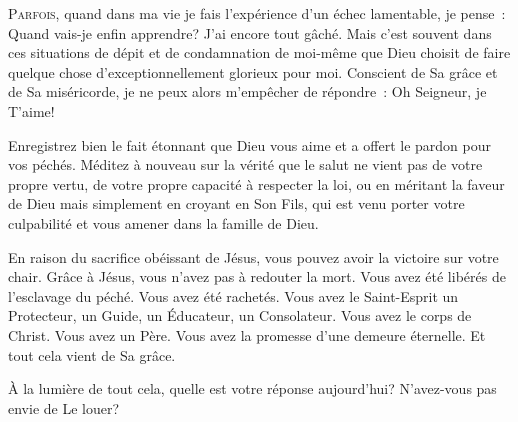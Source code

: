 \dvrule






\lettrine{P}{arfois}, quand dans ma vie je fais l'expérience
 d'un échec lamentable, je pense~: 
 \og Quand vais-je enfin apprendre? J'ai encore tout gâché. \fg{}
 Mais c'est souvent dans ces situations de dépit et de condamnation
 de moi-même que Dieu choisit de faire quelque chose d'exceptionnellement
 glorieux pour moi. Conscient de Sa grâce et de Sa miséricorde,
 je ne peux alors m'empêcher de répondre~: 
 \og Oh Seigneur, je T'aime! \fg{}


Enregistrez bien le fait étonnant que Dieu vous aime et a offert
 le pardon pour vos péchés. Méditez à nouveau sur la vérité
 que le salut ne vient pas de votre propre vertu,
 de votre propre capacité à respecter la loi,
 ou en méritant la faveur de Dieu mais simplement en croyant en Son Fils,
 qui est venu porter votre culpabilité et vous amener dans la famille de Dieu.

En raison du sacrifice obéissant de Jésus, vous pouvez avoir la victoire
 sur votre chair. Grâce à Jésus, vous n'avez pas à redouter la mort.
 Vous avez été libérés de l'esclavage du péché. Vous avez été rachetés.
 Vous avez le Saint-Esprit \ocadr un Protecteur, un Guide, un Éducateur,
 un Consolateur. Vous avez le corps de Christ. Vous avez un Père.
 Vous avez la promesse d'une demeure éternelle.
 Et tout cela vient de Sa grâce.

À la lumière de tout cela, quelle est votre réponse aujourd'hui?
 N'avez-vous pas envie de Le louer?

\dvrule



